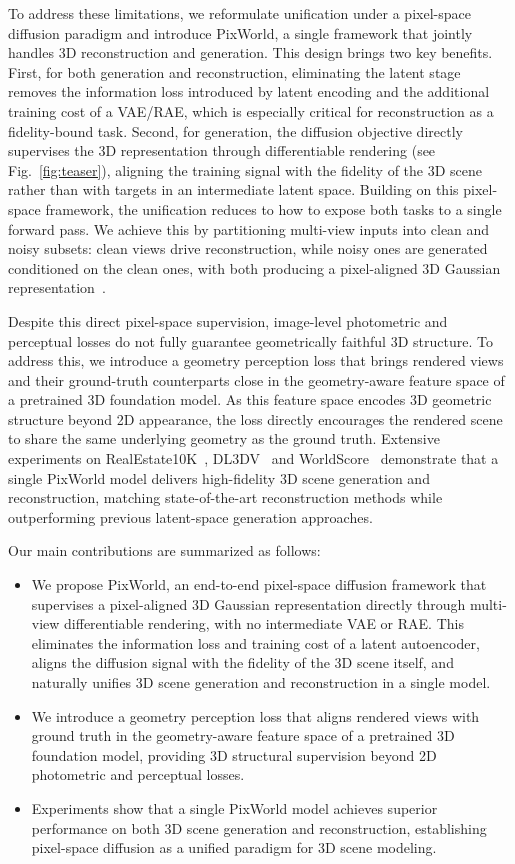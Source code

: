 To address these limitations, we reformulate unification under a pixel-space diffusion paradigm and introduce PixWorld, a single framework that jointly handles 3D reconstruction and generation. This design brings two key benefits. First, for both generation and reconstruction, eliminating the latent stage removes the information loss introduced by latent encoding and the additional training cost of a VAE/RAE, which is especially critical for reconstruction as a fidelity-bound task. Second, for generation, the diffusion objective directly supervises the 3D representation through differentiable rendering (see Fig.~\ref{fig:teaser}), aligning the training signal with the fidelity of the 3D scene rather than with targets in an intermediate latent space. Building on this pixel-space framework, the unification reduces to how to expose both tasks to a single forward pass. We achieve this by partitioning multi-view inputs into clean and noisy subsets: clean views drive reconstruction, while noisy ones are generated conditioned on the clean ones, with both producing a pixel-aligned 3D Gaussian representation~\citep{kerbl20233d}.


Despite this direct pixel-space supervision, image-level photometric and perceptual losses do not fully guarantee geometrically faithful 3D structure.
To address this, we introduce a geometry perception loss that brings rendered views and their ground-truth counterparts close in the geometry-aware feature space of a pretrained 3D foundation model. As this feature space encodes 3D geometric structure beyond 2D appearance, the loss directly encourages the rendered scene to share the same underlying geometry as the ground truth. Extensive experiments on RealEstate10K~\citep{zhou2018stereo}, DL3DV~\citep{ling2024dl3dv} and WorldScore~\citep{duan2025worldscore} demonstrate that a single PixWorld model delivers high-fidelity 3D scene generation and reconstruction, matching state-of-the-art reconstruction methods while outperforming previous latent-space generation approaches.

Our main contributions are summarized as follows:
\begin{itemize}
\item We propose PixWorld, an end-to-end pixel-space diffusion framework that supervises a pixel-aligned 3D Gaussian representation directly through multi-view differentiable rendering, with no intermediate VAE or RAE. This eliminates the information loss and training cost of a latent autoencoder, aligns the diffusion signal with the fidelity of the 3D scene itself, and naturally unifies 3D scene generation and reconstruction in a single model.
\item We introduce a geometry perception loss that aligns rendered views with ground truth in the geometry-aware feature space of a pretrained 3D foundation model, providing 3D structural supervision beyond 2D photometric and perceptual losses.
\item Experiments show that a single PixWorld model achieves superior performance on both 3D scene generation and reconstruction, establishing pixel-space diffusion as a unified paradigm for 3D scene modeling.
\end{itemize}
